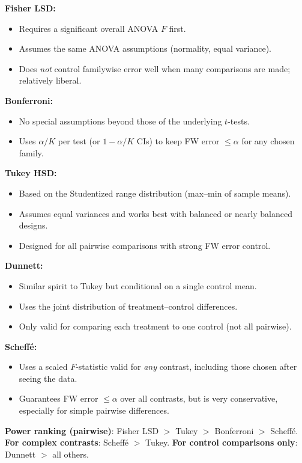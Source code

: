 \documentclass[9pt,letterpaper]{article}
\begin{document}
\textbf{Fisher LSD:}
\begin{itemize}
  \item Requires a significant overall ANOVA $F$ first.
  \item Assumes the same ANOVA assumptions (normality, equal variance).
  \item Does \emph{not} control familywise error well when many comparisons are made; relatively liberal.
\end{itemize}

\textbf{Bonferroni:}
\begin{itemize}
  \item No special assumptions beyond those of the underlying $t$-tests.
  \item Uses $\alpha/K$ per test (or $1-\alpha/K$ CIs) to keep FW error $\le\alpha$ for any chosen family.
\end{itemize}

\textbf{Tukey HSD:}
\begin{itemize}
  \item Based on the Studentized range distribution (max--min of sample means).
  \item Assumes equal variances and works best with balanced or nearly balanced designs.
  \item Designed for all pairwise comparisons with strong FW error control.
\end{itemize}

\textbf{Dunnett:}
\begin{itemize}
  \item Similar spirit to Tukey but conditional on a single control mean.
  \item Uses the joint distribution of treatment–control differences.
  \item Only valid for comparing each treatment to one control (not all pairwise).
\end{itemize}

\textbf{Scheffé:}
\begin{itemize}
  \item Uses a scaled $F$-statistic valid for \emph{any} contrast, including those chosen after seeing the data.
  \item Guarantees FW error $\le\alpha$ over all contrasts, but is very conservative, especially for simple pairwise differences.
\end{itemize}


\textbf{Power ranking (pairwise)}: Fisher LSD $>$ Tukey $>$ Bonferroni $>$ Scheff\'e.\\
\textbf{For complex contrasts}: Scheff\'e $>$ Tukey. \quad \textbf{For control comparisons only}: Dunnett $>$ all others.
\end{document}
